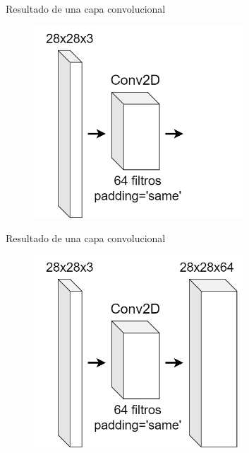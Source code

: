 \begin{frame}{Resultado de una capa convolucional}
\begin{figure}
    \centering
    \includegraphics[width=0.7\textwidth]{figures/Tema 3/ConvDimensions_1.png}
\end{figure}
\end{frame}

\begin{frame}{Resultado de una capa convolucional}
\begin{figure}
    \centering
    \includegraphics[width=0.7\textwidth]{figures/Tema 3/ConvDimensions_2.png}
\end{figure}
\end{frame}

